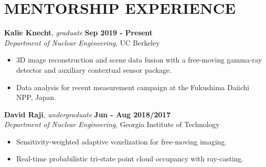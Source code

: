 \section{\small{MENTORSHIP EXPERIENCE}}

\textbf{Kalie Knecht}, \textsl{graduate} \hfill \textbf{Sep 2019 - Present} \\
\textsl{Department of Nuclear Engineering}, UC Berkeley \\[-2.8ex]
\begin{itemize}[leftmargin=4ex] \itemsep -2pt
    \item 3D image reconstruction and scene data fusion with a free-moving gamma-ray detector and auxiliary contextual sensor package.
    \item Data analysis for recent measurement campaign at the Fukushima Daiichi NPP, Japan.
\end{itemize}
\vspace{-5pt}


\textbf{David Raji}, \textsl{undergraduate} \hfill \textbf{Jun - Aug 2018/2017} \\
\textsl{Department of Nuclear Engineering}, Georgia Institute of Technology \\[-2.8ex]
\begin{itemize}[leftmargin=4ex] \itemsep -2pt
    \item Sensitivity-weighted adaptive voxelization for free-moving imaging.
    \item Real-time probabilistic tri-state point cloud occupancy with ray-casting.
\end{itemize}
